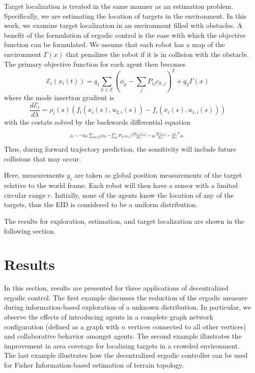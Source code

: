 \documentclass[conference]{IEEEtran}
\begin{document}
Target localization is treated in the same manner as an estimation problem. Specifically, we are estimating the location of targets in the environment. In this work, we examine target localization in an environment filled with obstacles. A benefit of the formulation of ergodic control is the ease with which the objective function can be formulated. We assume that each robot has a map of the environment $\Gamma(x)$ that penalizes the robot if it is in collision with the obstacle. The primary objective function for each agent then becomes
\begin{equation}
\mathcal{E}_i(x_i(t)) = q_1\sum_{k \in \mathbb{Z}} (\phi_k - \sum_j P_{ij} c_{k,j})^2 + q_2\Gamma(x)
 \end{equation}
where the mode insertion gradient is
\begin{equation*}
\frac{d \mathcal{E}_i}{d \lambda} = \rho_i(s) (f_i(x_i(s), u_{2,i}(s)) - f_i(x_i(s), u_{1,i}(s)))
\end{equation*}
with the costate solved by the backwards differential equation
\begin{equation*}
\resizebox{0.5 \textwidth}{!}
{ $
\dot{\rho}_i = - 2 q_1\sum_{k \in \mathcal{Z}}(\phi_k - \sum_j P _{ij} c_{k,j}) \frac{\partial F_{k,i}(x_i)}{\partial x_i} - q_2\frac{\partial \Gamma(x_i)}{\partial x_i}- \frac{\partial f_i}{\partial x_i }^T \rho_i .
$
}
\end{equation*}
Thus, during forward trajectory prediction, the sensitivity will include future collisions that may occur.

Here, measurements $y_i$ are taken as global position measurements of the target relative to the world frame. Each robot will then have a sensor with a limited circular range $r$. Initially, none of the agents know the location of any of the targets, thus the EID is considered to be a uniform distribution.

The results for exploration, estimation, and target localization are shown in the following section.

\section{Results} \label{sec:res}

In this section, results are presented for three applications of decentralized ergodic control. The first example discusses the reduction of the ergodic measure during information-based exploration of a unknown distribution. In particular, we observe the effects of introducing agents in a complete graph network configuration (defined as a graph with $n$ vertices connected to all other vertices) and collaborative behavior amongst agents. The second example illustrates the improvement in area coverage for localizing targets in a crowded environment. The last example illustrates how the decentralized ergodic controller can be used for Fisher Information-based estimation of terrain topology.
\end{document}
